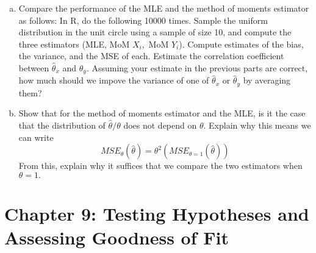 \documentclass{article}
\begin{document}
\begin{enumerate}
\begin{enumerate}[(a)]
			\item Compare the performance of the MLE and the method of moments estimator as follows: In R, do the following 10000 times. Sample the uniform distribution in the unit circle using a sample of size 10, and compute the three estimators (MLE, MoM $X_i,$ MoM $Y_i$). Compute estimates of the bias, the variance, and the MSE of each. Estimate the correlation coefficient between $\hat{\theta}_x$ and $\hat{\theta}_y.$ Assuming your estimate in the previous parts are correct, how much should we impove the variance of one of $\hat{\theta}_x$ or $\hat{\theta}_y$ by averaging them?

			\item Show that for the method of moments estimator and the MLE, is it the case that the distribution of $\hat{\theta}/\theta$ does not depend on $\theta.$ Explain why this means we can write \[MSE_\theta(\hat{\theta})=\theta^2\left( MSE_{\theta=1}(\hat{\theta}) \right)\] From this, explain why it suffices that we compare the two estimators when $\theta=1.$
				
		\end{enumerate}
		
\end{enumerate}

\section*{Chapter 9: Testing Hypotheses and Assessing Goodness of Fit}
\end{document}
